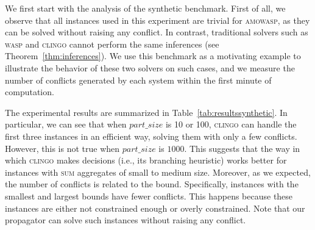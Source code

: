 \documentclass[preprint,authoryear]{elsarticle}
\newcommand{\clingo}{\textsc{clingo}\xspace}
\newcommand{\amowaspij}{\textsc{amowasp-base-py}\xspace}
\newcommand{\amoclingoijpy}{\textsc{amoclingo-base-py}\xspace}
\newcommand{\amoclingoijc}{\textsc{amoclingo-base-c}\xspace}
\newcommand{\eowaspij}{\textsc{eowasp-base-py}\xspace}
\newcommand{\eoclingoijpy}{\textsc{eoclingo-base-py}\xspace}
\newcommand{\eoclingoijc}{\textsc{eoclingo-base-c}\xspace}
\theoremstyle{definition}
\begin{document}
We first start with the analysis of the synthetic benchmark.
First of all, we observe that all instances used in this experiment are trivial for \textsc{amowasp}, as they can be solved without raising any conflict.  
In contrast, traditional solvers such as \textsc{wasp} and \textsc{clingo} cannot perform the same inferences (see Theorem~\ref{thm:inferences}).  
We use this benchmark as a motivating example to illustrate the behavior of these two solvers on such cases, and we measure the number of conflicts generated by each system within the first minute of computation.

The experimental results are summarized in Table~\ref{tab:resultssynthetic}.
In particular, we can see that when $\mathit{part\_size}$ is 10 or 100, \textsc{clingo} can handle the first three instances in an efficient way, solving them with only a few conflicts. However, this is not true when $\mathit{part\_size}$ is $1000$. This suggests that the way in which \textsc{clingo} makes decisions (i.e., its branching heuristic) works better for instances with \textsc{sum} aggregates of small to medium size.
Moreover, as we expected, the number of conflicts is related to the bound. Specifically, instances with the smallest and largest bounds have fewer conflicts. This happens because these instances are either not constrained enough or overly constrained.
Note that our propagator can solve 
such instances without raising any conflict.

\end{document}
